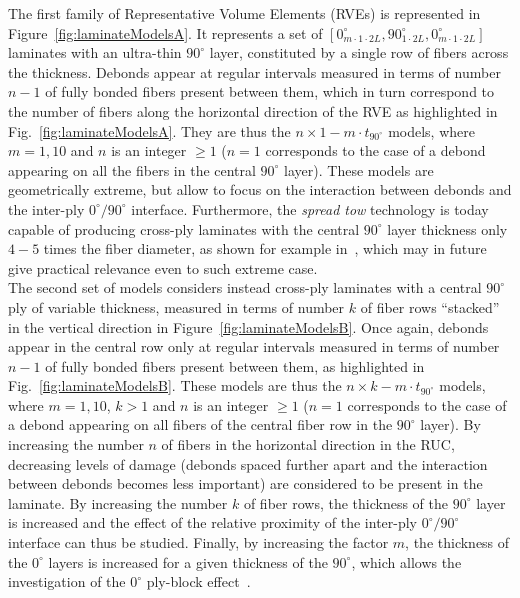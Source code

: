 \documentclass[Review,sagev,times]{sagej}
\begin{document}
The first family of Representative Volume Elements (RVEs) is represented in Figure~\ref{fig:laminateModelsA}. It represents a set of $\left[0_{m\cdot 1\cdot2L}^{\circ},90_{1\cdot2L}^{\circ},0_{m\cdot 1\cdot2L}^{\circ}\right]$ laminates with an ultra-thin $90^{\circ}$ layer, constituted by a single row of fibers across the thickness. Debonds appear at regular intervals measured in terms of number $n-1$ of fully bonded fibers present between them, which in turn correspond to the number of fibers along the horizontal direction of the RVE as highlighted in Fig.~\ref{fig:laminateModelsA}. They are thus the $n\times1-m\cdot t_{90^{\circ}}$ models, where $m=1,10$ and $n$ is an integer $\geq1$ ($n=1$ corresponds to the case of a debond appearing on all the fibers in the central $90^{\circ}$ layer). These models are geometrically extreme, but allow to focus on the interaction between debonds and the inter-ply $0^{\circ}/90^{\circ}$ interface. Furthermore, the \emph{spread tow} technology is today capable of producing cross-ply laminates with the central $90^{\circ}$ layer thickness only $4-5$ times the fiber diameter, as shown for example in~\cite{Saito2012}, which may in future give practical relevance even to such extreme case.\\
The second set of models considers instead cross-ply laminates with a central $90^{\circ}$ ply of variable thickness, measured in terms of number $k$ of fiber rows ``stacked'' in the vertical direction in Figure~\ref{fig:laminateModelsB}. Once again, debonds appear in the central row only at regular intervals measured in terms of number $n-1$ of fully bonded fibers present between them, as highlighted in Fig.~\ref{fig:laminateModelsB}. These models are thus the $n\times k-m\cdot t_{90^{\circ}}$ models, where $m=1,10$, $k>1$ and $n$ is an integer $\geq1$ ($n=1$ corresponds to the case of a debond appearing on all fibers of the central fiber row in the $90^{\circ}$ layer). By increasing the number $n$ of fibers in the horizontal direction in the RUC, decreasing levels of damage (debonds spaced further apart and the interaction between debonds becomes less important) are considered to be present in the laminate. By increasing the number $k$ of fiber rows, the thickness of the $90^{\circ}$ layer is increased and the effect of the relative proximity of the inter-ply $0^{\circ}/90^{\circ}$ interface can thus be studied. Finally, by increasing the factor $m$, the thickness of the $0^{\circ}$ layers is increased for a given thickness of the $90^{\circ}$, which allows the investigation of the $0^{\circ}$ ply-block effect~\cite{Teixeira2016}.
\end{document}
